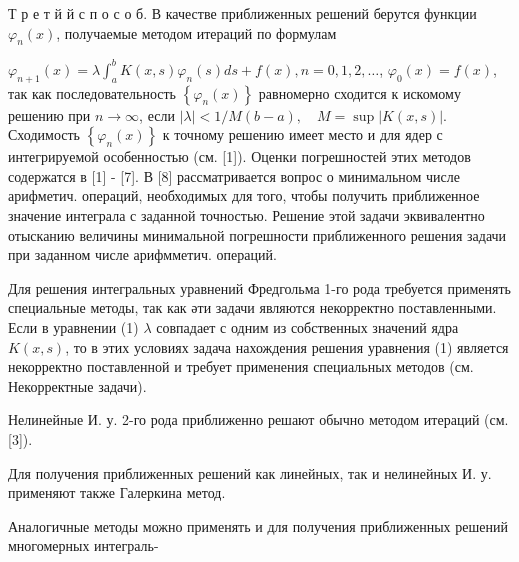 \documentclass[10pt]{article}
\begin{document}
Т р е т й й с п о с о б. В качестве приближенных решений берутся функции $\varphi_{n}(x)$, получаемые методом итераций по формулам



$\varphi_{n+1}(x)=\lambda \int_{a}^{b} K(x, s) \varphi_{n}(s) d s+f(x), n=0,1,2, \ldots$, $\varphi_{0}(x)=f(x)$, так как последовательность $\left\{\varphi_{n}(x)\right\}$ равномерно сходится к искомому решению при $n \rightarrow \infty$, если $|\lambda|<1 / M(b-a), \quad M=\sup |K(x, s)|$. Сходимость $\left\{\varphi_{n}(x)\right\}$ к точному решению имеет место и для ядер с интегрируемой особенностью (см. [1]). Оценки погрешностей этих методов содержатся в [1] - [7]. В [8] рассматривается вопрос о минимальном числе арифметич. операций, необходимых для того, чтобы получить приближенное значение интеграла с заданной точностью. Решение этой задачи эквивалентно отысканию величины минимальной погрешности приближенного решения задачи при заданном числе арифмметич. операций.



Для решения интегральных уравнений Фредгольма 1-го рода требуется применять специальные методы, так как әти задачи являются некорректно поставленными. Если в уравнении (1) $\lambda$ совпадает с одним из собственных значений ядра $K(x, s)$, то в этих условиях задача нахождения решения уравнения (1) является некорректно поставленной и требует применения специальных методов (см. Некорректные задачи).



Нелинейные И. у. 2-го рода приближенно решают обычно методом итераций (см. [3]).



Для получения приближенных решений как линейных, так и нелинейных И. у. применяют также Галеркина метод.



Аналогичные методы можно применять и для получения приближенных решений многомерных интеграль-
\end{document}
